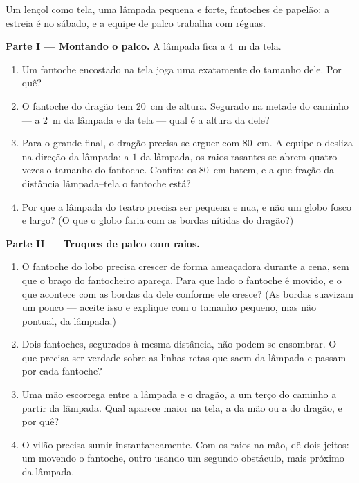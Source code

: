 \begin{problem}\label{pb:g6:light-propagation:1}
Um lençol como tela, uma lâmpada pequena e forte, fantoches de
papelão: a estreia é no sábado, e a equipe de palco trabalha com
réguas.

\medskip\noindent\textbf{Parte I --- Montando o palco.}
A lâmpada fica a \qty{4}{m} da tela.
\begin{enumerate}
  \item Um fantoche encostado na tela joga uma  exatamente do
        tamanho dele. Por quê?
  \item O fantoche do dragão tem \qty{20}{cm} de altura. Segurado na
        metade do caminho --- a \qty{2}{m} da lâmpada e da tela ---
        qual é a altura da  dele?
  \item Para o grande final, o dragão precisa se erguer com
        \qty{80}{cm}. A equipe o desliza na direção da lâmpada: a $1$
         da lâmpada, os raios rasantes se abrem quatro vezes o
        tamanho do fantoche. Confira: os \qty{80}{cm} batem, e a que
        fração da distância lâmpada--tela o fantoche está?
  \item Por que a lâmpada do teatro precisa ser pequena e nua, e não
        um globo fosco e largo? (O que o globo faria com as bordas
        nítidas do dragão?)
\end{enumerate}

\medskip\noindent\textbf{Parte II --- Truques de palco com raios.}
\begin{enumerate}[resume]
  \item O fantoche do lobo precisa crescer de forma ameaçadora
        durante a cena, sem que o braço do fantocheiro apareça. Para
        que lado o fantoche é movido, e o que acontece com as bordas
        da  dele conforme ele cresce? (As bordas suavizam um
        pouco --- aceite isso e explique com o tamanho pequeno, mas
        não pontual, da lâmpada.)
  \item Dois fantoches, segurados à mesma distância, não podem se
        ensombrar. O que precisa ser verdade sobre as linhas retas
        que saem da lâmpada e passam por cada fantoche?
  \item Uma mão escorrega entre a lâmpada e o dragão, a um terço do
        caminho a partir da lâmpada. Qual  aparece maior na
        tela, a da mão ou a do dragão, e por quê?
  \item O vilão precisa sumir instantaneamente. Com os raios na mão,
        dê dois jeitos: um movendo o fantoche, outro usando um
        segundo obstáculo, mais próximo da lâmpada.
\end{enumerate}


\end{problem}
